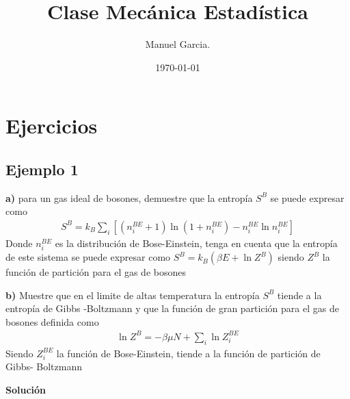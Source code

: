 \documentclass{article}
\title{Clase Mecánica Estadística }
\author{Manuel Garcia.}
\date{\today}
\begin{document}
\maketitle

\section{Ejercicios }
\subsection{Ejemplo 1 }

\textbf{a) } para un gas ideal de bosones, demuestre que la entropía $ S^B  $ se puede expresar como 
\begin{gather*}
  S^B = k_B \displaystyle\sum_{i }^{}\left[(n_i ^ {BE } + 1 ) \ln (1 + n_i^{BE }) - n_i ^ {BE } \ln n_i ^ {BE }\right] 
\end{gather*}
Donde $ n_i ^ {BE } $ es la distribución de Bose-Einstein, tenga en cuenta que la entropía de este sistema se puede expresar como $ S^B = k_B (\beta E+ \ln Z^B ) $ siendo $ Z ^B  $ la función de partición para el gas de bosones 

\textbf{b) } Muestre que en el limite de altas temperatura la entropía $ S ^B  $ tiende a la entropía de Gibbs -Boltzmann y que la función de gran partición para el gas de bosones definida como 
\begin{gather*}
  \ln Z^B = - \beta\mu N + \displaystyle\sum_{i }^{} \ln Z_i ^ {BE } 
\end{gather*}
Siendo $ Z_i ^ {BE } $ la función de Bose-Einstein, tiende a la función de partición de Gibbs- Boltzmann 

\textbf{Solución }
\end{document}
